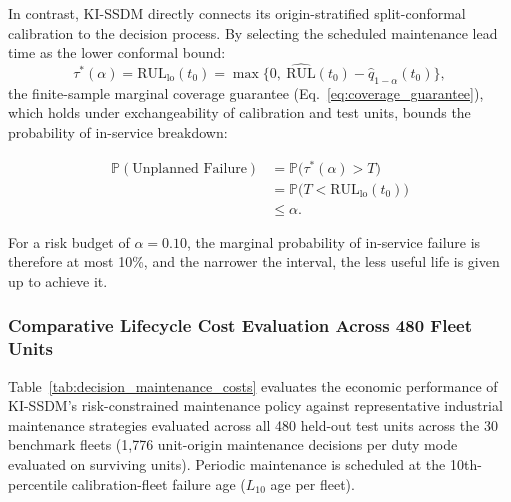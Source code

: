 \documentclass[a4paper,fleqn]{cas-dc}
\begin{document}
In contrast, KI-SSDM directly connects its origin-stratified split-conformal calibration to the decision process. By selecting the scheduled maintenance lead time as the lower conformal bound:
\begin{equation}
    \tau^*(\alpha) = \mathrm{RUL}_{\mathrm{lo}}(t_0) = \max\bigl\{0,\ \widehat{\mathrm{RUL}}(t_0) - \hat{q}_{1-\alpha}(t_0)\bigr\},
    \label{eq:conformal_lead_time}
\end{equation}
the finite-sample marginal coverage guarantee (Eq.~\eqref{eq:coverage_guarantee}), which holds under exchangeability of calibration and test units, bounds the probability of in-service breakdown:

\begin{equation}
\label{eq:conformal_risk_bound}
\begin{aligned}
\mathbb{P}(\text{Unplanned Failure})
&= \mathbb{P}\bigl(\tau^*(\alpha)>T\bigr)\\
&= \mathbb{P}\bigl(
T<\mathrm{RUL}_{\mathrm{lo}}(t_0)
\bigr)\\
&\leq \alpha.
\end{aligned}
\end{equation}

For a risk budget of $\alpha = 0.10$, the marginal probability of in-service failure is therefore at most 10\%, and the narrower the interval, the less useful life is given up to achieve it.

\subsubsection{Comparative Lifecycle Cost Evaluation Across 480 Fleet Units}
Table~\ref{tab:decision_maintenance_costs} evaluates the economic performance of KI-SSDM's risk-constrained maintenance policy against representative industrial maintenance strategies evaluated across all 480 held-out test units across the 30 benchmark fleets (1,776 unit-origin maintenance decisions per duty mode evaluated on surviving units). Periodic maintenance is scheduled at the 10th-percentile calibration-fleet failure age ($L_{10}$ age per fleet).
\end{document}
